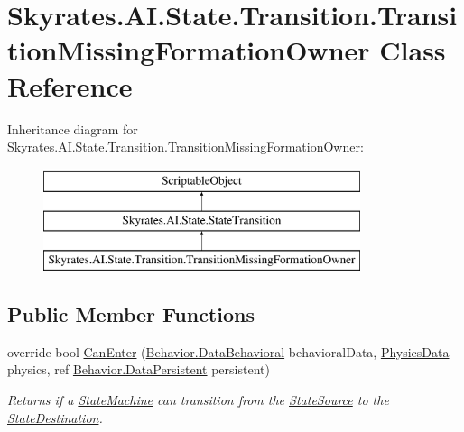 \hypertarget{class_skyrates_1_1_a_i_1_1_state_1_1_transition_1_1_transition_missing_formation_owner}{\section{Skyrates.\-A\-I.\-State.\-Transition.\-Transition\-Missing\-Formation\-Owner Class Reference}
\label{class_skyrates_1_1_a_i_1_1_state_1_1_transition_1_1_transition_missing_formation_owner}
}
Inheritance diagram for Skyrates.\-A\-I.\-State.\-Transition.\-Transition\-Missing\-Formation\-Owner\-:\begin{figure}[H]
\begin{center}
\leavevmode
\includegraphics[height=3.000000cm]{class_skyrates_1_1_a_i_1_1_state_1_1_transition_1_1_transition_missing_formation_owner}
\end{center}
\end{figure}
\subsection*{Public Member Functions}
\begin{DoxyCompactItemize}
\item 
override bool \hyperlink{class_skyrates_1_1_a_i_1_1_state_1_1_transition_1_1_transition_missing_formation_owner_a5007021285f55c85bec2bf2fee921deb}{Can\-Enter} (\hyperlink{class_skyrates_1_1_a_i_1_1_behavior_1_1_data_behavioral}{Behavior.\-Data\-Behavioral} behavioral\-Data, \hyperlink{class_skyrates_1_1_physics_1_1_physics_data}{Physics\-Data} physics, ref \hyperlink{class_skyrates_1_1_a_i_1_1_behavior_1_1_data_persistent}{Behavior.\-Data\-Persistent} persistent)
\begin{DoxyCompactList}\small\item\em Returns if a \hyperlink{class_skyrates_1_1_a_i_1_1_state_1_1_state_machine}{State\-Machine} can transition from the \hyperlink{class_skyrates_1_1_a_i_1_1_state_1_1_state_transition_a15c97c73b5e83f2bda77c5f4fb2521c6}{State\-Source} to the \hyperlink{class_skyrates_1_1_a_i_1_1_state_1_1_state_transition_a445177b14011fbc85aec78ecd04680f8}{State\-Destination}. \end{DoxyCompactList}\end{DoxyCompactItemize}
